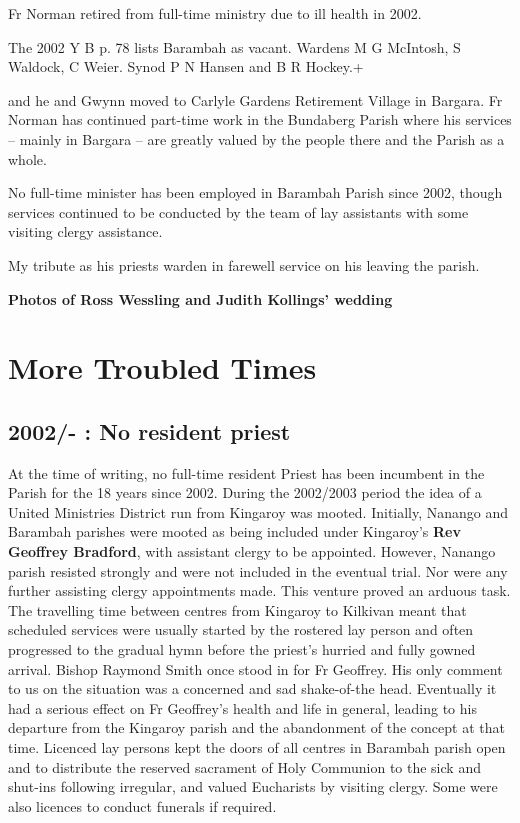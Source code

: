 Fr Norman retired from full-time ministry due to ill health in 2002.

The 2002 Y B p. 78 lists Barambah as vacant. Wardens M G McIntosh, S
Waldock, C Weier. Synod P N Hansen and B R Hockey.+

and he and Gwynn moved to Carlyle Gardens Retirement Village in Bargara.
Fr Norman has continued part-time work in the Bundaberg Parish where his
services -- mainly in Bargara -- are greatly valued by the people there
and the Parish as a whole.

No full-time minister has been employed in Barambah Parish since 2002,
though services continued to be conducted by the team of lay assistants
with some visiting clergy assistance.

My tribute as his priests warden in farewell service on his leaving the
parish.

\textbf{Photos of Ross Wessling and Judith Kollings' wedding}

\chapter{More Troubled Times}

\section{2002/- : No resident priest}

At the time of writing, no full-time resident Priest has been incumbent
in the Parish for the 18 years since 2002. During the 2002/2003 period
the idea of a United Ministries District run from Kingaroy was mooted.
Initially, Nanango and Barambah parishes were mooted as being included
under Kingaroy's \textbf{Rev Geoffrey Bradford}, with assistant clergy
to be appointed. However, Nanango parish resisted strongly and were not
included in the eventual trial. Nor were any further assisting clergy
appointments made. This venture proved an arduous task. The travelling
time between centres from Kingaroy to Kilkivan meant that scheduled
services were usually started by the rostered lay person and often
progressed to the gradual hymn before the priest's hurried and fully
gowned arrival. Bishop Raymond Smith once stood in for Fr Geoffrey. His
only comment to us on the situation was a concerned and sad shake-of-the
head. Eventually it had a serious effect on Fr Geoffrey's health and
life in general, leading to his departure from the Kingaroy parish and
the abandonment of the concept at that time. Licenced lay persons kept
the doors of all centres in Barambah parish open and to distribute the
reserved sacrament of Holy Communion to the sick and shut-ins following
irregular, and valued Eucharists by visiting clergy. Some were also
licences to conduct funerals if required.

